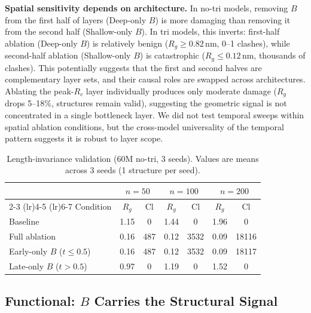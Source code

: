 \documentclass{article}
\begin{document}
\textbf{Spatial sensitivity depends on architecture.}
In no-tri models, removing $B$ from the first half of layers (Deep-only $B$) is more damaging than removing it from the second half (Shallow-only $B$).
In tri models, this inverts: first-half ablation (Deep-only $B$) is relatively benign ($R_g \geq 0.82$\,nm, 0--1 clashes), while second-half ablation (Shallow-only $B$) is catastrophic ($R_g \leq 0.12$\,nm, thousands of clashes).
This potentially suggests that the first and second halves are complementary layer sets, and their causal roles are swapped across architectures.
Ablating the peak-$R_c$ layer individually produces only moderate damage ($R_g$ drops 5--18\%, structures remain valid), suggesting the geometric signal is not concentrated in a single bottleneck layer.
We did not test temporal sweeps within spatial ablation conditions, but the cross-model universality of the temporal pattern suggests it is robust to layer scope.

\begin{table}[h]
    \centering
    \caption{Length-invariance validation (60M no-tri, 3 seeds). Values are means across 3 seeds (1 structure per seed).}
    \label{tab:multilength}
    \begin{tabular}{lcccccc}
        \toprule
        & \multicolumn{2}{c}{\textbf{$n{=}50$}} & \multicolumn{2}{c}{\textbf{$n{=}100$}} & \multicolumn{2}{c}{\textbf{$n{=}200$}} \\
        \cmidrule(lr){2-3} \cmidrule(lr){4-5} \cmidrule(lr){6-7}
        Condition & $R_g$ & Cl & $R_g$ & Cl & $R_g$ & Cl \\
        \midrule
        Baseline & 1.15 & 0 & 1.44 & 0 & 1.96 & 0 \\
        Full ablation & 0.16 & 487 & 0.12 & 3532 & 0.09 & 18116 \\
        Early-only $B$ ($t{\leq}0.5$) & 0.16 & 487 & 0.12 & 3532 & 0.09 & 18117 \\
        Late-only $B$ ($t{>}0.5$) & 0.97 & 0 & 1.19 & 0 & 1.52 & 0 \\
        \bottomrule
    \end{tabular}
\end{table}

\subsection{Functional: $B$ Carries the Structural Signal}
\label{sec:functional}
\end{document}
